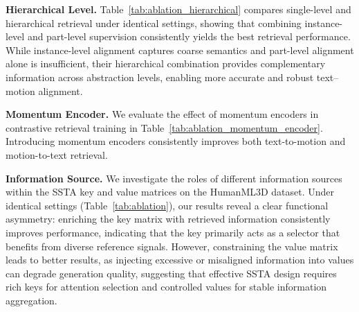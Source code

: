 \documentclass[10pt,journal,compsoc]{IEEEtran}
\newcommand{\myparagraph}[1]{\textbf{#1}\hspace{1.8ex}}
\begin{document}
            





\noindent \myparagraph{Hierarchical Level.}
Table~\ref{tab:ablation_hierarchical} compares single-level and hierarchical retrieval under identical settings, showing that combining instance-level and part-level supervision consistently yields the best retrieval performance. While instance-level alignment captures coarse semantics and part-level alignment alone is insufficient, their hierarchical combination provides complementary information across abstraction levels, enabling more accurate and robust text–motion alignment.



\noindent \myparagraph{Momentum Encoder.}
We evaluate the effect of momentum encoders in contrastive retrieval training in Table~\ref{tab:ablation_momentum_encoder}. Introducing momentum encoders consistently improves both text-to-motion and motion-to-text retrieval.

\noindent \myparagraph{Information Source.}
We investigate the roles of different information sources within the SSTA key and value matrices on the HumanML3D dataset. Under identical settings (Table~\ref{tab:ablation}), our results reveal a clear functional asymmetry: enriching the key matrix with retrieved information consistently improves performance, indicating that the key primarily acts as a selector that benefits from diverse reference signals. However, constraining the value matrix leads to better results, as injecting excessive or misaligned information into values can degrade generation quality, suggesting that effective SSTA design requires rich keys for attention selection and controlled values for stable information aggregation.
\end{document}
